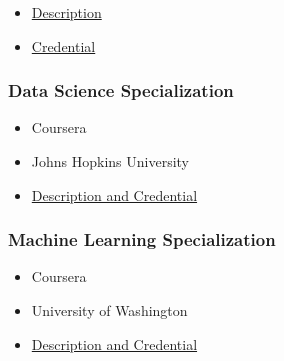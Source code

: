 \documentclass[
]{article}
\providecommand{\tightlist}{%
  \setlength{\itemsep}{0pt}\setlength{\parskip}{0pt}}
\begin{document}
\begin{itemize}
\tightlist
\item
  \href{https://aws.amazon.com/certification/certified-cloud-practitioner/}{Description}
\item
  \href{https://www.youracclaim.com/badges/32350702-5891-436d-a581-f5428aab3ad5/public_url}{Credential}
\end{itemize}

\hypertarget{data-science-specialization}{%
\subsubsection{Data Science
Specialization}\label{data-science-specialization}}

\begin{itemize}
\tightlist
\item
  Coursera
\item
  Johns Hopkins University
\item
  \href{https://www.coursera.org/account/accomplishments/specialization/KH5MS3AGYLHT}{Description
  and Credential}
\end{itemize}

\hypertarget{machine-learning-specialization}{%
\subsubsection{Machine Learning
Specialization}\label{machine-learning-specialization}}

\begin{itemize}
\tightlist
\item
  Coursera
\item
  University of Washington
\item
  \href{https://www.coursera.org/account/accomplishments/specialization/QXC4X9QML6EW}{Description
  and Credential}
\end{itemize}
\end{document}

